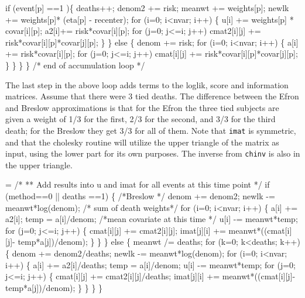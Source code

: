 \documentclass{article}
\newcommand{\code}[1]{\texttt{#1}}
\begin{document}
\begin{nwchunk}
         if (event[p] ==1 )\{
             deaths++;
             denom2 += risk;
             meanwt += weights[p];
             newlk += weights[p]* (eta[p] - recenter);
             for (i=0; i<nvar; i++) \{
                 u[i] += weights[p] * covar[i][p];
                 a2[i]+= risk*covar[i][p];
                 for (j=0; j<=i; j++)
                     cmat2[i][j] += risk*covar[i][p]*covar[j][p];
             \}
         \}
         else \{
             denom += risk;
             for (i=0; i<nvar; i++) \{
                 a[i] += risk*covar[i][p];
                 for (j=0; j<=i; j++)
                     cmat[i][j] += risk*covar[i][p]*covar[j][p];
             \}
         \} 
     \}
 \}   /* end  of accumulation loop */
\end{nwchunk}

The last step in the above loop adds terms to the loglik, score and
information matrices.  Assume that there were 3 tied deaths.
The difference between the Efron and Breslow approximations is that for the
Efron the three tied subjects are given a weight of 1/3 for the first, 2/3 for
the second, and 3/3 for the third death; for the Breslow they get 3/3 for
all of them.  
Note that \code{imat} is symmetric, and that the cholesky routine will
utilize the upper triangle of the matrix as input, using the lower part for
its own purposes.  The inverse from \code{chinv} is also in the upper
triangle.
\begin{nwchunk}
=
 /*
 ** Add results into u and imat for all events at this time point
 */
 if (method==0 || deaths ==1) \{ /*Breslow */
     denom += denom2;
     newlk -= meanwt*log(denom);  /* sum of death weights*/ 
     for (i=0; i<nvar; i++) \{
         a[i] += a2[i];
         temp = a[i]/denom;   /*mean covariate at this time */
         u[i] -= meanwt*temp;
         for (j=0; j<=i; j++) \{
             cmat[i][j] += cmat2[i][j];
             imat[j][i] += meanwt*((cmat[i][j]- temp*a[j])/denom);
         \}
     \}
 \}
 else \{
     meanwt /= deaths;
     for (k=0; k<deaths; k++) \{
         denom += denom2/deaths;
         newlk -= meanwt*log(denom);
         for (i=0; i<nvar; i++) \{
             a[i] += a2[i]/deaths;
             temp = a[i]/denom;
             u[i] -= meanwt*temp;
             for (j=0; j<=i; j++) \{
                 cmat[i][j] += cmat2[i][j]/deaths;
                 imat[j][i] += meanwt*((cmat[i][j]- temp*a[j])/denom);
             \}
             \}
     \}
 \}
\end{nwchunk}
\end{document}
